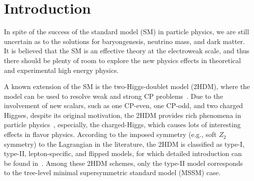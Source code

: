 \documentclass[prd,preprint,superscriptaddress,amsmath,amssymb]{revtex4}
\begin{document}
\section{Introduction}

In spite of the success of the standard model (SM) in particle physics, we are still uncertain as to the solutions for  baryongenesis, neutrino mass, and dark matter. It is believed that the SM is an effective theory at the electroweak scale, and thus there should be plenty of room to explore the new  physics effects in  theoretical and experimental high energy physics.

A known extension of the SM is the two-Higgs-doublet model (2HDM), where the model can be used to resolve weak and strong CP problems~\cite{Lee:1973iz,Peccei:1977hh}. Due to  the involvement of new scalars, such as  one CP-even, one CP-odd, and two charged Higgses, despite its original motivation, the 2HDM provides rich phenomena in particle physics~\cite{Gunion:1989we,Chen:2014xva,Benbrik:2015evd,Chen:2016xju}, especially, the charged-Higgs, which causes lots of interesting effects in flavor physics. According to the imposed symmetry (e.g., soft $Z_2$ symmetry) to the Lagrangian in the literature, the 2HDM is classified as type-I, type-II, lepton-specific, and flipped models, for which  detailed introduction can be found in~\cite{Branco:2011iw}. Among these 2HDM schemes,  only the type-II model corresponds to the tree-level minimal supersymmetric standard model (MSSM) case. 
\end{document}
